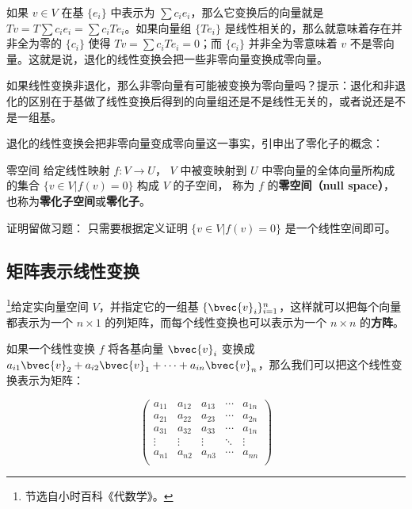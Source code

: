 如果 ${v}\in V$ 在基 $\{{e}_i\}$ 中表示为 $\sum c_i {e}_i$，那么它变换后的向量就是 $T {v}=T\sum c_i {e}_i=\sum c_iT {e}_i$。如果向量组 $\{T {e}_i\}$ 是线性相关的，那么就意味着存在并非全为零的 $\{c_i\}$ 使得 $T {v}=\sum c_iT {e}_i=0$；而 $\{c_i\}$ 并非全为零意味着 ${v}$ 不是零向量。这就是说，退化的线性变换会把一些非零向量变换成零向量。

\begin{exercise}{}
如果线性变换非退化，那么非零向量有可能被变换为零向量吗？提示：退化和非退化的区别在于基做了线性变换后得到的向量组还是不是线性无关的，或者说还是不是一组基。
\end{exercise}

退化的线性变换会把非零向量变成零向量这一事实，引申出了零化子的概念：

\begin{theorem}{零空间}\label{LinMap_the1}
给定线性映射 $f:V\to U$， $V$ 中被变映射到 $U$ 中零向量的全体向量所构成的集合 $\{{v}\in V|f(v)= 0\}$ 构成 $V$ 的子空间， 称为 $f$ 的\textbf{零空间（null space）}， 也称为\textbf{零化子空间}或\textbf{零化子}。
\end{theorem}
证明留做习题： 只需要根据定义证明 $\{{v}\in V|f(v)= 0\}$ 是一个线性空间即可。 


\subsection{矩阵表示线性变换}

\footnote{节选自小时百科《代数学》。}给定实向量空间 $V$，并指定它的一组基 $\{\bvec{v}_i\}_{i=1}^n$，这样就可以把每个向量都表示为一个 $n\times 1$ 的列矩阵，而每个线性变换也可以表示为一个 $n\times n$ 的\textbf{方阵}。

如果一个线性变换 $f$ 将各基向量 $\bvec{v}_i$ 变换成 $a_{i1}\bvec{v}_2+a_{i2}\bvec{v}_1+\cdots+a_{in}\bvec{v}_n$，那么我们可以把这个线性变换表示为矩阵：

\begin{equation}
    \begin{pmatrix}
    a_{11}&a_{12}&a_{13}&\cdots&a_{1n}\\
    a_{21}&a_{22}&a_{23}&\cdots&a_{2n}\\
    a_{31}&a_{32}&a_{33}&\cdots&a_{1n}\\
    \vdots&\vdots&\vdots&\ddots&\vdots\\
    a_{n1}&a_{n2}&a_{n3}&\cdots&a_{nn}\\
    \end{pmatrix}
\end{equation}

